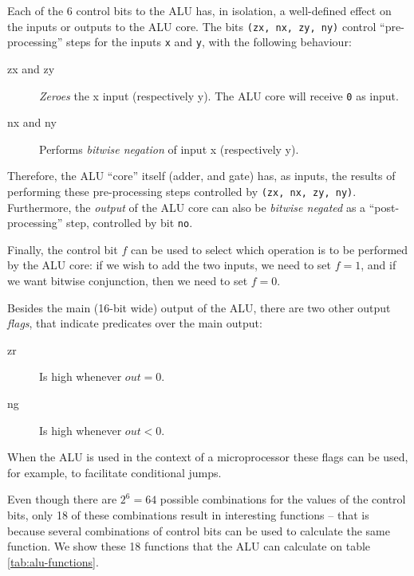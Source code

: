 \documentclass[a4paper]{article}
\begin{document}
            Each of the 6 control bits to the ALU has, in isolation, a well-defined effect on the
            inputs or outputs to the ALU core. The bits \texttt{(zx, nx, zy, ny)} control
            ``pre-processing'' steps for the inputs \texttt{x} and \texttt{y}, with the following
            behaviour:

            \begin{description}
                \item[zx and zy] \emph{Zeroes} the x input (respectively y). The ALU core will
                    receive \texttt{0} as input.
                \item[nx and ny] Performs \emph{bitwise negation} of input x (respectively y).
            \end{description}

            Therefore, the ALU ``core'' itself (adder, and gate) has, as inputs, the results of
            performing these pre-processing steps controlled by \texttt{(zx, nx, zy, ny)}.
            Furthermore, the \emph{output} of the ALU core can also be \emph{bitwise negated} as a
            ``post-processing'' step, controlled by bit \texttt{no}.

            Finally, the control bit $f$ can be used to select which operation is to be performed by
            the ALU core: if we wish to add the two inputs, we need to set $f = 1$, and if we want
            bitwise conjunction, then we need to set $f = 0$.

            Besides the main (16-bit wide) output of the ALU, there are two other output
            \emph{flags}, that indicate predicates over the main output:

            \begin{description}
                \item[zr] Is high whenever $out = 0$.
                \item[ng] Is high whenever $out < 0$.
            \end{description}

            When the ALU is used in the context of a microprocessor these flags can be used, for
            example, to facilitate conditional jumps.

            Even though there are $2^{6} = 64$ possible combinations for the values of the control
            bits, only 18 of these combinations result in interesting functions -- that is because
            several combinations of control bits can be used to calculate the same function. We show
            these 18 functions that the ALU can calculate on table \ref{tab:alu-functions}.
            
\end{document}
